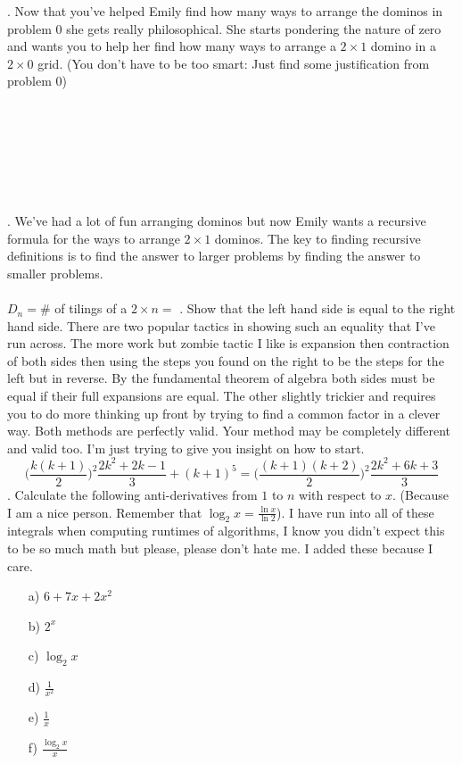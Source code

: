 \documentclass[12pt]{article}
\begin{document}
. Now that you've helped Emily find how many ways to arrange the dominos in problem 0 she gets really philosophical. She starts pondering the nature of zero and wants you to help her find how many ways to arrange a $2 \times 1$ domino in a $2 \times 0$ grid. (You don't have to be too smart: Just find some justification from problem 0)\\\\\\\\\\\\\\\\
. We've had a lot of fun arranging dominos but now Emily wants a recursive formula for the ways to arrange $2 \times 1$ dominos. The key to finding recursive definitions is to find the answer to larger problems by finding the answer to smaller problems.\\\\
$D_n = $\# of tilings of a $2 \times n =$
\newpage
{}. Show that the left hand side is equal to the right hand side. 
There are two popular tactics in showing such an equality that I've run across. 
The more work but zombie tactic I like is expansion then contraction of both sides then using
the steps you found on the right to be the steps for the left but in reverse. By the fundamental theorem of algebra
both sides must be equal if their full expansions are equal. The other slightly
trickier and requires you to do more thinking up front by trying to find a common factor
in a clever way. Both methods are perfectly valid. Your method may be completely different and valid too.
I'm just trying to give you insight on how to start.
$$\bigg(\frac{k(k + 1)}{2}\bigg)^2\frac{2k^2+2k-1}{3} + (k + 1)^5=\big(\frac{(k+1)(k + 2)}{2}\big)^2\frac{2k^2+6k+3}{3} $$
\newpage
{}. Calculate the following anti-derivatives from $1$ to $n$ with respect to $x$. (Because I am a nice person. Remember that $\log_2{x}=\frac{\ln{x}}{\ln{2}}$). I have run into all of these integrals when computing runtimes of algorithms, I know you didn't expect this to be so much math but please, please don't hate me. I added these because I care.
\begin{enumerate}
    \item[a)]$6+7x+2x^2$
    \item[b)]$2^x$
    \item[c)]$\log_{2}{x}$
    \item[d)]$\frac{1}{x^2}$
    \item[e)]$\frac{1}{x}$
    \item[f)]$\frac{\log_{2}{x}}{x}$
\end{enumerate}
\end{document}
